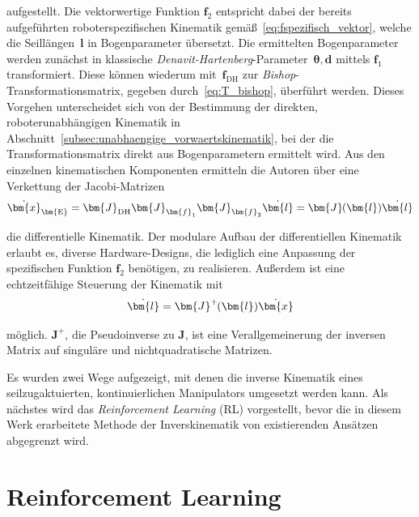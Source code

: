 aufgestellt. Die vektorwertige Funktion $\bm{f}_2$ entspricht dabei der bereits aufgeführten roboterspezifischen Kinematik gemäß~\eqref{eq:fspezifisch_vektor}, welche die Seillängen~$\bm{l}$ in Bogenparameter übersetzt. Die ermittelten Bogenparameter werden zunächst in klassische \textit{Denavit-Hartenberg}-Parameter~$\bm{\theta, \bm{d}}$ mittels $\bm{f}_1$ transformiert. Diese können wiederum mit~$\bm{f}_{\mathrm{DH}}$ zur \textit{Bishop}-Transformationsmatrix, gegeben durch~\eqref{eq:T_bishop}, überführt werden. Dieses Vorgehen unterscheidet sich von der Bestimmung der direkten, roboterunabhängigen Kinematik in Abschnitt~\ref{subsec:unabhaengige_vorwaertskinematik}, bei der die Transformationsmatrix direkt aus Bogenparametern ermittelt wird. Aus den einzelnen kinematischen Komponenten ermitteln die Autoren über eine Verkettung der Jacobi-Matrizen
\begin{align}
\dot{\bm{x}}_{\bm{\mathrm{E}}} = \bm{J}_{\mathrm{DH}} \bm{J}_{\bm{f}_1} \bm{J}_{\bm{f}_2}  \dot{\bm{l}} 
= \bm{J}\mkern-1mu (\bm{l}) \dot{\bm{l}}
\label{eq:modulare_differentielle_kinematik}
\end{align}

die differentielle Kinematik. Der modulare Aufbau der differentiellen Kinematik erlaubt es, diverse Hardware-Designs, die lediglich eine Anpassung der spezifischen Funktion $\bm{f}_2$ benötigen, zu realisieren. Außerdem ist eine echtzeitfähige Steuerung der Kinematik mit
\begin{align}
\dot{\bm{l}} = \bm{J}^{+} \mkern-2mu(\bm{l}) \dot{\bm{x}}
\label{eq:inverse_differentielle_kinematik}
\end{align}

möglich. $\bm{J}^{+}$, die Pseudoinverse zu $\bm{J}$, ist eine Verallgemeinerung der inversen Matrix auf singuläre und nichtquadratische Matrizen. \newline

Es wurden zwei Wege aufgezeigt, mit denen die inverse Kinematik eines seilzugaktuierten, kontinuierlichen Manipulators umgesetzt werden kann. Als nächstes wird das \textit{Reinforcement Learning} (RL) vorgestellt, bevor die in diesem Werk erarbeitete Methode der Inverskinematik von existierenden Ansätzen abgegrenzt wird.






\section{Reinforcement Learning}
\label{sec:rl_allgemein}

